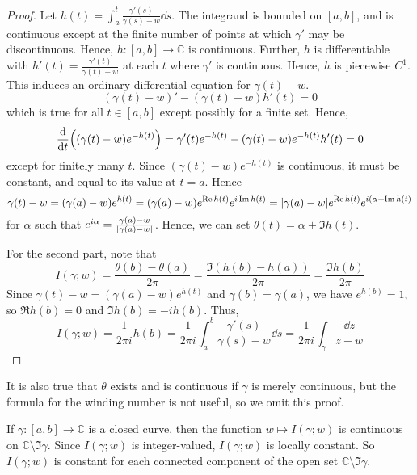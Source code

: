 \begin{proof}
	Let \( h(t) = \int_a^t \frac{\gamma'(s)}{\gamma(s) - w} \dd{s} \).
	The integrand is bounded on \( [a,b] \), and is continuous except at the finite number of points at which \( \gamma' \) may be discontinuous.
	Hence, \( h \colon [a,b] \to \mathbb C \) is continuous.
	Further, \( h \) is differentiable with \( h'(t) = \frac{\gamma'(t)}{\gamma(t) - w} \) at each \( t \) where \( \gamma' \) is continuous.
	Hence, \( h \) is piecewise \( C^1 \).
	This induces an ordinary differential equation for \( \gamma(t) - w \).
	\[ (\gamma(t) - w)' - (\gamma(t) - w)h'(t) = 0 \]
	which is true for all \( t \in [a,b] \) except possibly for a finite set.
	Hence,
	\[ \dv{t} \qty((\gamma(t) - w) e^{-h(t)}) = \gamma'(t) e^{-h(t)} - (\gamma(t) - w)e^{-h(t)} h'(t) = 0 \]
	except for finitely many \( t \).
	Since \( (\gamma(t) - w)e^{-h(t)} \) is continuous, it must be constant, and equal to its value at \( t = a \).
	Hence
	\[ \gamma(t) - w = (\gamma(a) - w)e^{h(t)} = (\gamma(a) - w)e^{\Re h(t)} e^{i\Im h(t)} = \abs{\gamma(a)-w} e^{\Re h(t)} e^{i(\alpha + \Im h(t)} \]
	for \( \alpha \) such that \( e^{i\alpha} = \frac{\gamma(a) - w}{\abs{\gamma(a) - w}} \).
	Hence, we can set \( \theta(t) = \alpha + \Im h(t) \).

	For the second part, note that
	\[ I(\gamma;w) = \frac{\theta(b) - \theta(a)}{2\pi} = \frac{\Im(h(b) - h(a))}{2\pi} = \frac{\Im h(b)}{2\pi} \]
	Since \( \gamma(t) - w = (\gamma(a) - w)e^{h(t)} \) and \( \gamma(b) = \gamma(a) \), we have \( e^{h(b)} = 1 \), so \( \Re h(b) = 0 \) and \( \Im h(b) = -i h(b) \).
	Thus,
	\[ I(\gamma;w) = \frac{1}{2\pi i} h(b) = \frac{1}{2\pi i} \int_a^b \frac{\gamma'(s)}{\gamma(s) - w} \dd{s} = \frac{1}{2\pi i} \int_\gamma \frac{\dd{z}}{z-w} \]
\end{proof}
\begin{remark}
	It is also true that \( \theta \) exists and is continuous if \( \gamma \) is merely continuous, but the formula for the winding number is not useful, so we omit this proof.
\end{remark}
\begin{proposition}
	If \( \gamma \colon [a,b] \to \mathbb C \) is a closed curve, then the function \( w \mapsto I(\gamma;w) \) is continuous on \( \mathbb C \setminus \Im \gamma \).
	Since \( I(\gamma;w) \) is integer-valued, \( I(\gamma;w) \) is locally constant.
	So \( I(\gamma;w) \) is constant for each connected component of the open set \( \mathbb C \setminus \Im \gamma \).
\end{proposition}
